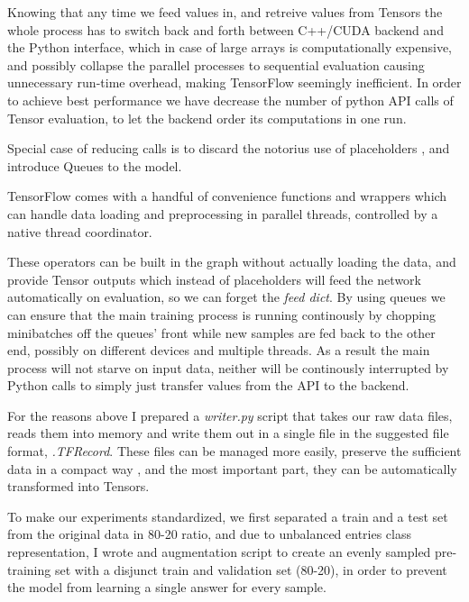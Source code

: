 Knowing that any time we feed values in, and retreive values from Tensors the whole process has to switch back and forth between C++/CUDA backend and the Python interface, which in case of large arrays is computationally expensive, and possibly collapse the parallel processes to sequential evaluation causing unnecessary run-time overhead, making TensorFlow seemingly inefficient.
In order to achieve best performance we have decrease the number of python API calls of Tensor evaluation, to let the backend order its computations in one run.

Special case of reducing calls is to discard the notorius use of placeholders \cite{placeholder-remove-MEDIUM-blog}, and introduce Queues to the model.

TensorFlow comes with a handful of convenience functions and wrappers which can handle data loading and preprocessing in parallel threads, controlled by a native thread coordinator.

These operators can be built in the graph without actually loading the data, and provide Tensor outputs which instead of placeholders will feed the network automatically on evaluation, so we can forget the \textit{feed dict}.
By using queues we can ensure that the main training process is running continously by chopping minibatches off the queues' front while new samples are fed back to the other end, possibly on different devices and multiple threads.
As a result the main process will not starve on input data, neither will be continously interrupted by Python calls to simply just transfer values from the API to the backend.

For the reasons above I prepared a \textit{writer.py} script that takes our raw data files, reads them into memory and write them out in a single file in the suggested file format, \textit{.TFRecord}.
These files can be managed more easily, preserve the sufficient data in a compact way \cite{tf-records-howto}, and the most important part, they can be automatically transformed into Tensors.

To make our experiments standardized, we first separated a train and a test set from the original data in 80-20 ratio, and due to unbalanced entries class representation, I wrote and augmentation script to create an evenly sampled pre-training set with a disjunct train and validation set (80-20), in order to prevent the model from learning a single answer for every sample.

